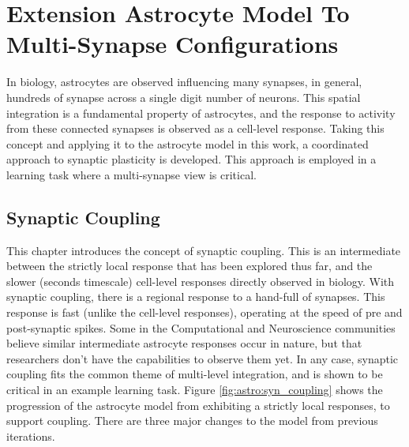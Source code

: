 \chapter{Extension Astrocyte Model To Multi-Synapse
  Configurations} \label{chapter:obj3}

In biology, astrocytes are observed influencing many synapses, in general,
hundreds of synapse across a single digit number of neurons. This spatial
integration is a fundamental property of astrocytes, and the response to
activity from these connected synapses is observed as a cell-level \ca
response. Taking this concept and applying it to the astrocyte model
in this work, a coordinated approach to synaptic plasticity is developed. This
approach is employed in a learning task where a multi-synapse view is critical.



  

\section{Synaptic Coupling}
This chapter introduces the concept of synaptic coupling. This is an
intermediate between the strictly local response that has been explored thus
far, and the slower (seconds timescale) cell-level responses directly observed
in biology. With synaptic coupling, there is a regional response to a hand-full
of synapses.  This response is fast (unlike the cell-level \ca responses),
operating at the speed of pre and post-synaptic spikes. Some in the
Computational and Neuroscience communities believe similar intermediate
astrocyte responses occur in nature, but that researchers don't have the
capabilities to observe them yet. In any case, synaptic coupling fits the common
theme of multi-level integration, and is shown to be critical in an example
learning task. Figure \ref{fig:astro:syn_coupling} shows the progression of the
astrocyte model from exhibiting a strictly local responses, to support
coupling. There are three major changes to the model from previous iterations.

